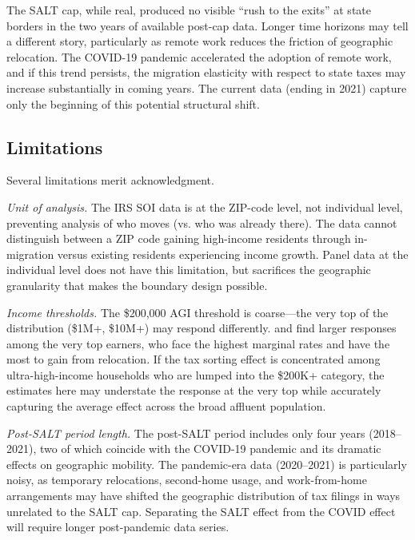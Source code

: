 \documentclass[12pt]{article}
\begin{document}
The SALT cap, while real, produced no visible ``rush to the exits'' at state borders in the two years of available post-cap data. Longer time horizons may tell a different story, particularly as remote work reduces the friction of geographic relocation. The COVID-19 pandemic accelerated the adoption of remote work, and if this trend persists, the migration elasticity with respect to state taxes may increase substantially in coming years. The current data (ending in 2021) capture only the beginning of this potential structural shift.

\subsection{Limitations}

Several limitations merit acknowledgment.

\textit{Unit of analysis.} The IRS SOI data is at the ZIP-code level, not individual level, preventing analysis of who moves (vs. who was already there). The data cannot distinguish between a ZIP code gaining high-income residents through in-migration versus existing residents experiencing income growth. Panel data at the individual level \citep{young2016millionaire} does not have this limitation, but sacrifices the geographic granularity that makes the boundary design possible.

\textit{Income thresholds.} The \$200,000 AGI threshold is coarse---the very top of the distribution (\$1M+, \$10M+) may respond differently. \citet{kleven2014migration} and \citet{moretti2017effect} find larger responses among the very top earners, who face the highest marginal rates and have the most to gain from relocation. If the tax sorting effect is concentrated among ultra-high-income households who are lumped into the \$200K+ category, the estimates here may understate the response at the very top while accurately capturing the average effect across the broad affluent population.

\textit{Post-SALT period length.} The post-SALT period includes only four years (2018--2021), two of which coincide with the COVID-19 pandemic and its dramatic effects on geographic mobility. The pandemic-era data (2020--2021) is particularly noisy, as temporary relocations, second-home usage, and work-from-home arrangements may have shifted the geographic distribution of tax filings in ways unrelated to the SALT cap. Separating the SALT effect from the COVID effect will require longer post-pandemic data series.
\end{document}
